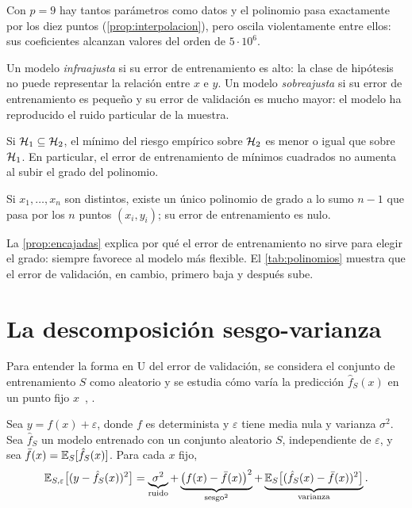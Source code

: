 Con $p=9$ hay tantos parámetros como datos y el polinomio pasa exactamente por los diez puntos (\cref{prop:interpolacion}), pero oscila violentamente entre ellos: sus coeficientes alcanzan valores del orden de $5\cdot 10^{6}$.

\begin{definicion}
Un modelo \emph{infraajusta} si su error de entrenamiento es alto: la clase de hipótesis no puede representar la relación entre $x$ e $y$. Un modelo \emph{sobreajusta} si su error de entrenamiento es pequeño y su error de validación es mucho mayor: el modelo ha reproducido el ruido particular de la muestra.
\end{definicion}

\begin{proposicion}\label{prop:encajadas}
Si $\mathcal{H}_1\subseteq\mathcal{H}_2$, el mínimo del riesgo empírico sobre $\mathcal{H}_2$ es menor o igual que sobre $\mathcal{H}_1$. En particular, el error de entrenamiento de mínimos cuadrados no aumenta al subir el grado del polinomio.
\end{proposicion}

\begin{proposicion}[Interpolación]\label{prop:interpolacion}
Si $x_1,\dots,x_n$ son distintos, existe un único polinomio de grado a lo sumo $n-1$ que pasa por los $n$ puntos $(x_i,y_i)$; su error de entrenamiento es nulo.
\end{proposicion}

La \cref{prop:encajadas} explica por qué el error de entrenamiento no sirve para elegir el grado: siempre favorece al modelo más flexible. El \cref{tab:polinomios} muestra que el error de validación, en cambio, primero baja y después sube.

\section{La descomposición sesgo-varianza}

Para entender la forma en U del error de validación, se considera el conjunto de entrenamiento $S$ como aleatorio y se estudia cómo varía la predicción $\hat f_S(x)$ en un punto fijo $x$~\cite[§8.1.1]{cs229}, \cite[§7.3]{esl}.

\begin{teorema}\label{teo:sesgo-varianza}
Sea $y=f(x)+\varepsilon$, donde $f$ es determinista y $\varepsilon$ tiene media nula y varianza $\sigma^{2}$. Sea $\hat f_S$ un modelo entrenado con un conjunto aleatorio $S$, independiente de $\varepsilon$, y sea $\bar f(x)=\mathbb{E}_S[\hat f_S(x)]$. Para cada $x$ fijo,
\[
\mathbb{E}_{S,\varepsilon}\bigl[(y-\hat f_S(x))^{2}\bigr]
=\underbrace{\sigma^{2}}_{\text{ruido}}
+\underbrace{\bigl(f(x)-\bar f(x)\bigr)^{2}}_{\text{sesgo}^{2}}
+\underbrace{\mathbb{E}_S\bigl[(\hat f_S(x)-\bar f(x))^{2}\bigr]}_{\text{varianza}}.
\]
\end{teorema}

